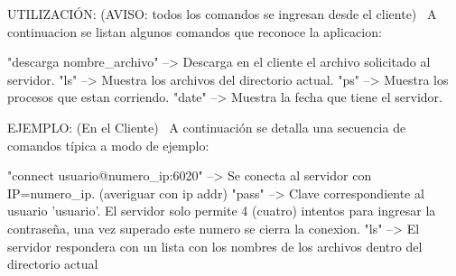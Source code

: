 \begin{DoxyParagraph}{U\+T\+I\+L\+I\+Z\+A\+C\+IÓN\+:}
(A\+V\+I\+SO\+: todos los comandos se ingresan desde el cliente)~\newline
A continuacion se listan algunos comandos que reconoce la aplicacion\+:~\newline
\begin{DoxyVerb}"descarga nombre_archivo"               --> Descarga en el cliente el archivo solicitado al servidor.
"ls"                                    --> Muestra los archivos del directorio actual.
"ps"                                    --> Muestra los procesos que estan corriendo.
"date"                                  --> Muestra la fecha que tiene el servidor.
\end{DoxyVerb}

\end{DoxyParagraph}
\begin{DoxyParagraph}{E\+J\+E\+M\+P\+LO\+:}
(En el Cliente)~\newline
A continuación se detalla una secuencia de comandos típica a modo de ejemplo\+:~\newline
\begin{DoxyVerb}"connect usuario@numero_ip:6020"    --> Se conecta al servidor con IP=numero_ip. (averiguar con ip addr)
"pass"                              --> Clave correspondiente al usuario 'usuario'. El servidor solo permite 4 (cuatro) intentos 
                                    para ingresar la contraseña, una vez superado este numero se cierra la conexion.            
"ls"                                --> El servidor respondera con un lista con los nombres de los archivos dentro del directorio actual\end{DoxyVerb}
 
\end{DoxyParagraph}
